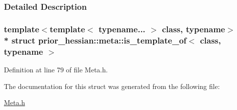 \subsubsection{Detailed Description}
\subsubsection*{template$<$template$<$ typename... $>$ class, typename$>$\\*
struct prior\+\_\+hessian\+::meta\+::is\+\_\+template\+\_\+of$<$ class, typename $>$}



Definition at line 79 of file Meta.\+h.



The documentation for this struct was generated from the following file\+:\begin{DoxyCompactItemize}
\item 
\hyperlink{Meta_8h}{Meta.\+h}\end{DoxyCompactItemize}
